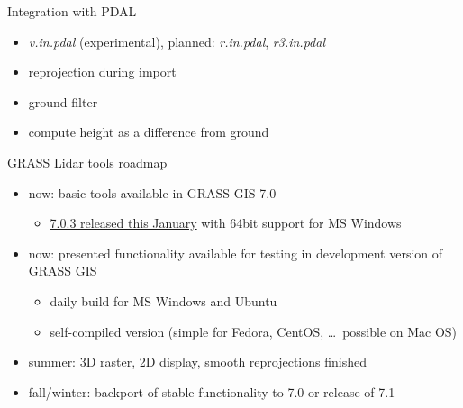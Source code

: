 \documentclass[xcolor={dvipsnames,usenames},beamer,aspectratio=169]{beamer}
\newcommand{\module}[1]{\emph{#1}}
\begin{document}

\begin{frame}{Integration with PDAL}

\begin{block}{}
 \begin{itemize}
  \item \module{v.in.pdal} (experimental), planned: \module{r.in.pdal}, \module{r3.in.pdal}
  \item reprojection during import
  \item ground filter
  \item compute height as a difference from ground
 \end{itemize}
\end{block}

\end{frame}

\begin{frame}{GRASS Lidar tools roadmap}

 \begin{itemize}
  \item now: basic tools available in GRASS GIS 7.0
    \begin{itemize}
      \item \href{https://grass.osgeo.org/news/54/15/GRASS-GIS-7-0-3-released/}{7.0.3 released this January}
        with 64bit support for MS Windows
    \end{itemize}
  \item now: presented functionality available for testing in development version of GRASS GIS
    \begin{itemize}
      \item daily build for MS Windows and Ubuntu
      \item self-compiled version (simple for Fedora, CentOS, \ldots\ possible on Mac OS)
    \end{itemize}
  \item summer: 3D raster, 2D display, smooth reprojections finished
  \item fall/winter: backport of stable functionality to 7.0 or release of 7.1
 \end{itemize}

\end{frame}
\end{document}

